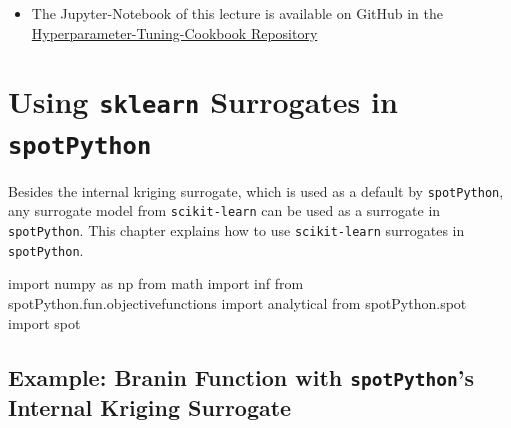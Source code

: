 \documentclass[
  letterpaper,
  DIV=11,
  numbers=noendperiod]{scrreprt}
\newenvironment{Shaded}{\begin{snugshade}}{\end{snugshade}}
\newcommand{\ImportTok}[1]{\textcolor[rgb]{0.00,0.46,0.62}{#1}}
\newcommand{\NormalTok}[1]{\textcolor[rgb]{0.00,0.23,0.31}{#1}}
\providecommand{\tightlist}{%
  \setlength{\itemsep}{0pt}\setlength{\parskip}{0pt}}\usepackage{longtable,booktabs,array}
\begin{document}
\begin{tcolorbox}[enhanced jigsaw, coltitle=black, bottomrule=.15mm, breakable, toprule=.15mm, colframe=quarto-callout-note-color-frame, title=\textcolor{quarto-callout-note-color}{\faInfo}\hspace{0.5em}{Note}, colbacktitle=quarto-callout-note-color!10!white, opacityback=0, left=2mm, leftrule=.75mm, colback=white, rightrule=.15mm, bottomtitle=1mm, toptitle=1mm, titlerule=0mm, arc=.35mm, opacitybacktitle=0.6]

\begin{itemize}
\tightlist
\item
  The Jupyter-Notebook of this lecture is available on GitHub in the
  \href{https://github.com/sequential-parameter-optimization/Hyperparameter-Tuning-Cookbook/blob/main/009_num_spot_anisotropic.ipynb}{Hyperparameter-Tuning-Cookbook
  Repository}
\end{itemize}

\end{tcolorbox}

\chapter{\texorpdfstring{Using \texttt{sklearn} Surrogates in
\texttt{spotPython}}{Using sklearn Surrogates in spotPython}}\label{sec-sklearn-surrogates}

Besides the internal kriging surrogate, which is used as a default by
\texttt{spotPython}, any surrogate model from \texttt{scikit-learn} can
be used as a surrogate in \texttt{spotPython}. This chapter explains how
to use \texttt{scikit-learn} surrogates in \texttt{spotPython}.

\begin{Shaded}
\begin{Highlighting}[]
\ImportTok{import}\NormalTok{ numpy }\ImportTok{as}\NormalTok{ np}
\ImportTok{from}\NormalTok{ math }\ImportTok{import}\NormalTok{ inf}
\ImportTok{from}\NormalTok{ spotPython.fun.objectivefunctions }\ImportTok{import}\NormalTok{ analytical}
\ImportTok{from}\NormalTok{ spotPython.spot }\ImportTok{import}\NormalTok{ spot}
\end{Highlighting}
\end{Shaded}

\section{\texorpdfstring{Example: Branin Function with
\texttt{spotPython}'s Internal Kriging
Surrogate}{Example: Branin Function with spotPython's Internal Kriging Surrogate}}\label{example-branin-function-with-spotpythons-internal-kriging-surrogate}
\end{document}
